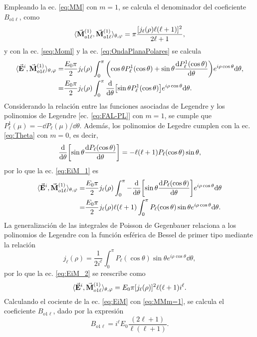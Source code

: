 Empleando la ec. \eqref{eq:MM} con $m=1$, se calcula el denominador del coeficiente $B_{o1\ell}$, como
	\begin{equation}
			\langle \va{M}_{o1\ell}^{(1)} ,\va{M}_{o1\ell}^{(1)} \rangle_{\theta,\varphi} = \pi \frac{[j_\ell(\rho) \ell(\ell+1)]^2}{2\ell+1},
			\label{eq:MMm=1}
	\end{equation}
y con la ec. \eqref{seq:Moml} y la ec. \eqref{eq:OndaPlanaPolares} se calcula
	\begin{align}
		\langle \va{E}^i, \va{M}_{o1\ell}^{(1)}  \rangle_{\theta,\varphi} 
			=& \frac{E_0 \pi}{2} j_\ell(\rho) \int_0^\pi \qty(\cos\theta P_\ell^1(\cos\theta)+\sin\theta \dv{P_\ell^1(\cos\theta)}{\theta})e^{i\rho\cos\theta}\dd\theta,\notag\\
			=& \frac{E_0 \pi}{2} j_\ell(\rho) \int_0^\pi \dv{\theta}\qty[\sin\theta P_\ell^1(\cos\theta)]e^{i\rho\cos\theta}\dd\theta. \label{eq:EiM_1}
	\end{align}
Considerando la relación entre las funciones asociadas de Legendre y los polinomios de Legendre [ec. \eqref{eq:FAL-PL}] con $m=1$, se cumple que $P_\ell^1(\mu)=-\dd P_\ell(\mu)/\dd\theta$. Además, los polinomios de Legedre cumplen con la ec. \eqref{eq:Theta} con $m=0$, es decir,
	\begin{equation*}
	\dv{\theta}\qty[\sin\theta \dv{P_\ell(\cos\theta)}{\theta}] = - \ell(\ell+1)P_\ell(\cos\theta) \sin\theta,
	\end{equation*}
por lo que la ec. \eqref{eq:EiM_1} es
	\begin{align}
	\langle \va{E}^i, \va{M}_{o1\ell}^{(1)}  \rangle_{\theta,\varphi}
			 = & \frac{E_0 \pi}{2} j_\ell(\rho) \int_0^\pi -\dv{\theta}\qty[\sin\theta \dv{P_\ell(\cos\theta)}{\theta}]e^{i\rho\cos\theta}\dd\theta\notag\\
			  = & \frac{E_0 \pi}{2} j_\ell(\rho) \ell(\ell+1)\int_0^\pi P_\ell(\cos\theta)\sin\theta e^{i\rho\cos\theta}\dd\theta.\label{eq:EiM_2}
	\end{align}
La generalización de las integrales de Poisson de Gegenbauer  relaciona a los polinomios de Legendre con la función esférica de Bessel de primer tipo mediante la relación
	\begin{equation*}
	j_\ell(\rho) = \frac{1}{2i^\ell}\int_0^\pi P_\ell(\cos\theta)\sin\theta e^{i\rho\cos\theta}\dd\theta,
	\end{equation*}
por lo que la ec. \eqref{eq:EiM_2} se reescribe como
	\begin{equation}
	\langle \va{E}^i, \va{M}_{o1\ell}^{(1)}  \rangle_{\theta,\varphi}
			=  E_0 \pi [j_\ell(\rho)]^2 \ell(\ell+1) i^\ell.\label{eq:EiM}
	\end{equation}
Calculando el cociente de la ec.  \eqref{eq:EiM} con \eqref{eq:MMm=1}, se calcula el coeficiente $B_{o1\ell}$, dado por la expresión
	\begin{equation}
	B_{o1\ell} = i^\ell  E_0 \frac{ (2\ell+1)}{\ell(\ell+1)}.
	\end{equation}

